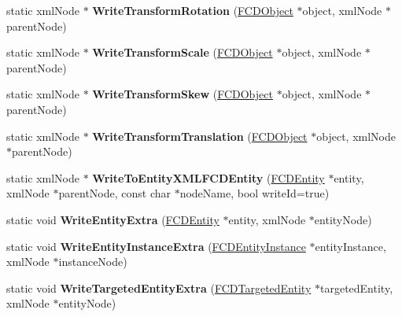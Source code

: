 \begin{DoxyCompactItemize}
\item 
\hypertarget{classFArchiveXML_aea7100c70dad99ff2ac5ad6e067de117}{
static xmlNode $\ast$ {\bfseries WriteTransformRotation} (\hyperlink{classFCDObject}{FCDObject} $\ast$object, xmlNode $\ast$parentNode)}
\label{classFArchiveXML_aea7100c70dad99ff2ac5ad6e067de117}

\item 
\hypertarget{classFArchiveXML_a63daeab153e77ba51ec8572490c90931}{
static xmlNode $\ast$ {\bfseries WriteTransformScale} (\hyperlink{classFCDObject}{FCDObject} $\ast$object, xmlNode $\ast$parentNode)}
\label{classFArchiveXML_a63daeab153e77ba51ec8572490c90931}

\item 
\hypertarget{classFArchiveXML_add94c40762481e636b6f5db574d30578}{
static xmlNode $\ast$ {\bfseries WriteTransformSkew} (\hyperlink{classFCDObject}{FCDObject} $\ast$object, xmlNode $\ast$parentNode)}
\label{classFArchiveXML_add94c40762481e636b6f5db574d30578}

\item 
\hypertarget{classFArchiveXML_acb9a7d6c0bd6c96f5f36591991638375}{
static xmlNode $\ast$ {\bfseries WriteTransformTranslation} (\hyperlink{classFCDObject}{FCDObject} $\ast$object, xmlNode $\ast$parentNode)}
\label{classFArchiveXML_acb9a7d6c0bd6c96f5f36591991638375}

\item 
\hypertarget{classFArchiveXML_a90a5b09426c94ede663cf714988fd37b}{
static xmlNode $\ast$ {\bfseries WriteToEntityXMLFCDEntity} (\hyperlink{classFCDEntity}{FCDEntity} $\ast$entity, xmlNode $\ast$parentNode, const char $\ast$nodeName, bool writeId=true)}
\label{classFArchiveXML_a90a5b09426c94ede663cf714988fd37b}

\item 
\hypertarget{classFArchiveXML_ac9d27deb3f41a681b21a3319939162ed}{
static void {\bfseries WriteEntityExtra} (\hyperlink{classFCDEntity}{FCDEntity} $\ast$entity, xmlNode $\ast$entityNode)}
\label{classFArchiveXML_ac9d27deb3f41a681b21a3319939162ed}

\item 
\hypertarget{classFArchiveXML_a3823567796ad14b199aa0823a6c6c7df}{
static void {\bfseries WriteEntityInstanceExtra} (\hyperlink{classFCDEntityInstance}{FCDEntityInstance} $\ast$entityInstance, xmlNode $\ast$instanceNode)}
\label{classFArchiveXML_a3823567796ad14b199aa0823a6c6c7df}

\item 
\hypertarget{classFArchiveXML_ad4b2d4193b9e44f8b922310d831eb04c}{
static void {\bfseries WriteTargetedEntityExtra} (\hyperlink{classFCDTargetedEntity}{FCDTargetedEntity} $\ast$targetedEntity, xmlNode $\ast$entityNode)}
\label{classFArchiveXML_ad4b2d4193b9e44f8b922310d831eb04c}


\end{DoxyCompactItemize}
